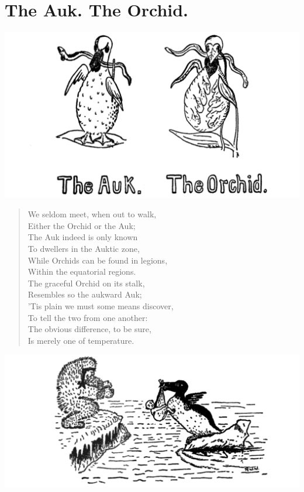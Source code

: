 \documentclass[letterpaper, 10pt, openany]{memoir}
\begin{document}
\chapter{The Auk. The Orchid.}
\includegraphics[width=1\textwidth]{f-p18.png}
\vspace{\onelineskip}
\begin{verse}\huge
We seldom meet, when out to walk,\\
Either the Orchid or the Auk;\\
The Auk indeed is only known\\
To dwellers in the Auktic zone,\\
While Orchids can be found in legions,\\
Within the equatorial regions.\\
The graceful Orchid on its stalk,\\
Resembles so the aukward Auk;\\
\newpage
'Tis plain we must some means discover,\\
To tell the two from one another:\\
The obvious difference, to be sure,\\
Is merely one of temperature.\\
\end{verse}

\vspace{\onelineskip}
\includegraphics[width=1\textwidth]{f-p19.png}
\vspace{\onelineskip}
\end{document}
